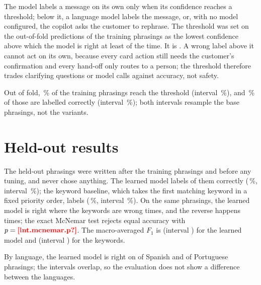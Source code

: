 The model labels a message on its own only when its confidence reaches a threshold; below it, a language model
labels the message, or, with no model configured, the copilot asks the customer to rephrase. The threshold was set on
the out-of-fold predictions of the training phrasings as the lowest confidence above which the model is right at
least  of the time. It is . A wrong label above it cannot
act on its own, because every card action still needs the customer's confirmation and every hand-off only routes to
a person; the threshold therefore trades clarifying questions or model calls against accuracy, not safety.

Out of fold, \,\% of the training phrasings reach the threshold (interval
\,\%), and \,\% of those are labelled correctly
(interval \,\%); both intervals resample the  base
phrasings, not the variants.

\section{Held-out results}

The  held-out phrasings were written after the training phrasings and before any tuning,
and never chose anything. The learned model labels  of them correctly
(\,\%, interval \,\%); the keyword baseline, which takes the
first matching keyword in a fixed priority order, labels 
(\,\%, interval \,\%). On the same phrasings, the learned model
is right where the keywords are wrong  times, and the reverse happens
 times; the exact McNemar test rejects equal accuracy with $p = \est{int.mcnemar}{p}$. The
macro-averaged $F_1$ is  (interval ) for the learned model and
 (interval ) for the keywords.

By language, the learned model is right on  of  Spanish and
 of  Portuguese phrasings; the intervals overlap, so the
evaluation does not show a difference between the languages.

